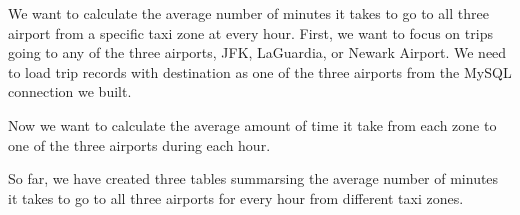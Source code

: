 \documentclass[12pt,twoside]{reedthesis}
\newenvironment{Shaded}{\begin{snugshade}}{\end{snugshade}}
\newcommand{\KeywordTok}[1]{\textcolor[rgb]{0.13,0.29,0.53}{\textbf{#1}}}
\newcommand{\DataTypeTok}[1]{\textcolor[rgb]{0.13,0.29,0.53}{#1}}
\newcommand{\DecValTok}[1]{\textcolor[rgb]{0.00,0.00,0.81}{#1}}
\newcommand{\StringTok}[1]{\textcolor[rgb]{0.31,0.60,0.02}{#1}}
\newcommand{\OtherTok}[1]{\textcolor[rgb]{0.56,0.35,0.01}{#1}}
\newcommand{\OperatorTok}[1]{\textcolor[rgb]{0.81,0.36,0.00}{\textbf{#1}}}
\newcommand{\NormalTok}[1]{#1}
\theoremstyle{definition}
\theoremstyle{definition}
\theoremstyle{definition}
\theoremstyle{remark}
\begin{document}
We want to calculate the average number of minutes it takes to go to all
three airport from a specific taxi zone at every hour. First, we want to
focus on trips going to any of the three airports, JFK, LaGuardia, or
Newark Airport. We need to load trip records with destination as one of
the three airports from the MySQL connection we built.
\begin{Shaded}
\end{Shaded}
Now we want to calculate the average amount of time it take from each
zone to one of the three airports during each hour.

So far, we have created three tables summarsing the average number of
minutes it takes to go to all three airports for every hour from
different taxi zones.
\end{document}
